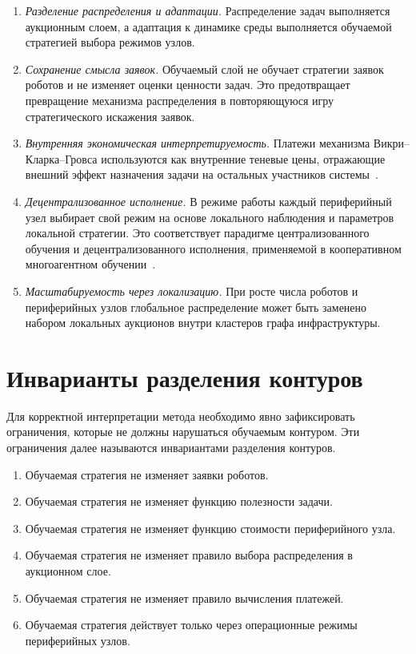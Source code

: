 \begin{enumerate}
    \item \textit{Разделение распределения и адаптации.} Распределение задач выполняется аукционным слоем, а адаптация к динамике среды выполняется обучаемой стратегией выбора режимов узлов.
    \item \textit{Сохранение смысла заявок.} Обучаемый слой не обучает стратегии заявок роботов и не изменяет оценки ценности задач. Это предотвращает превращение механизма распределения в повторяющуюся игру стратегического искажения заявок.
    \item \textit{Внутренняя экономическая интерпретируемость.} Платежи механизма Викри--Кларка--Гровса используются как внутренние теневые цены, отражающие внешний эффект назначения задачи на остальных участников системы~\cite{Vickrey1961Counterspeculation,Clarke1971MultipartPricing,Groves1973IncentivesTeams}.
    \item \textit{Децентрализованное исполнение.} В режиме работы каждый периферийный узел выбирает свой режим на основе локального наблюдения и параметров локальной стратегии. Это соответствует парадигме централизованного обучения и децентрализованного исполнения, применяемой в кооперативном многоагентном обучении~\cite{Rashid2018QMIX}.
    \item \textit{Масштабируемость через локализацию.} При росте числа роботов и периферийных узлов глобальное распределение может быть заменено набором локальных аукционов внутри кластеров графа инфраструктуры.
\end{enumerate}

\section{Инварианты разделения контуров}

Для корректной интерпретации метода необходимо явно зафиксировать ограничения, которые не должны нарушаться обучаемым контуром. Эти ограничения далее называются инвариантами разделения контуров.

\begin{enumerate}
    \item Обучаемая стратегия не изменяет заявки роботов.
    \item Обучаемая стратегия не изменяет функцию полезности задачи.
    \item Обучаемая стратегия не изменяет функцию стоимости периферийного узла.
    \item Обучаемая стратегия не изменяет правило выбора распределения в аукционном слое.
    \item Обучаемая стратегия не изменяет правило вычисления платежей.
    \item Обучаемая стратегия действует только через операционные режимы периферийных узлов.
\end{enumerate}

